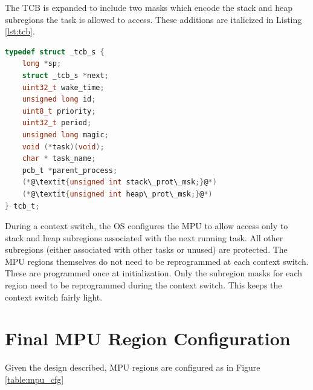 The TCB is expanded to include two masks which encode the stack and heap subregions the task is allowed to access. These additions are italicized in Listing \ref{lst:tcb}.

\begin{lstlisting}[language=c, caption={TCB struct definition}, captionpos=b, label={lst:tcb}]
typedef struct _tcb_s {
    long *sp;
    struct _tcb_s *next;
    uint32_t wake_time;
    unsigned long id;
    uint8_t priority;
    uint32_t period;
    unsigned long magic;
    void (*task)(void);
    char * task_name;
    pcb_t *parent_process;
    (*@\textit{unsigned int stack\_prot\_msk;}@*)
    (*@\textit{unsigned int heap\_prot\_msk;}@*)
} tcb_t;
\end{lstlisting}

During a context switch, the OS configures the MPU to allow access only to stack and heap subregions associated with the next running task. All other subregions (either associated with other tasks or unused) are protected. The MPU regions themselves do not need to be reprogrammed at each context switch. These are programmed once at initialization. Only the subregion masks for each region need to be reprogrammed during the context switch. This keeps the context switch fairly light.

\section{Final MPU Region Configuration}

Given the design described, MPU regions are configured as in Figure \ref{table:mpu_cfg}



